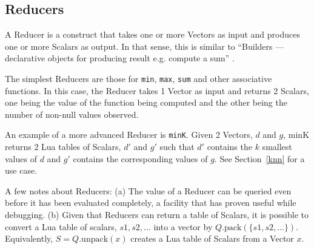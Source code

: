 \subsection{Reducers}
\label{reducers}

A Reducer is a construct that takes one or more Vectors as input and produces
one or more Scalars as output. In that sense, this is similar to ``Builders ---
declarative objects for producing result e.g. compute a sum'' \cite{Weld2017}.

The simplest Reducers are those for {\tt min},
{\tt max}, {\tt sum} and other associative functions. 
In this case, the Reducer takes 1 Vector as input and 
returns 2 Scalars, one
being the value of the function being computed and the other being the number of
non-null values observed. 

An example of a more advanced Reducer is {\tt minK}. 
Given 2 Vectors, \(d\) and \(g\), minK returns 2
Lua tables of Scalars, \(d'\) and \(g'\) such that \(d'\) contains the \(k\)
smallest values of \(d\) and \(g'\) contains the corresponding values of \(g\).
See Section~\ref{knn} for a use case.

A few notes about Reducers: (a) 
The value of a Reducer can be queried even before it has been evaluated 
completely, a facility that has proven useful while debugging. 
(b) Given that Reducers can return a table of Scalars,
it is possible to 
convert a Lua table of scalars, \(s1, s2, \ldots\) into a vector by
\(Q.\mathrm{pack}(\{s1, s2, \ldots\})\).
Equivalently, \(S = Q.\mathrm{unpack}(x)\) creates a Lua table of Scalars from a
Vector \(x\).

